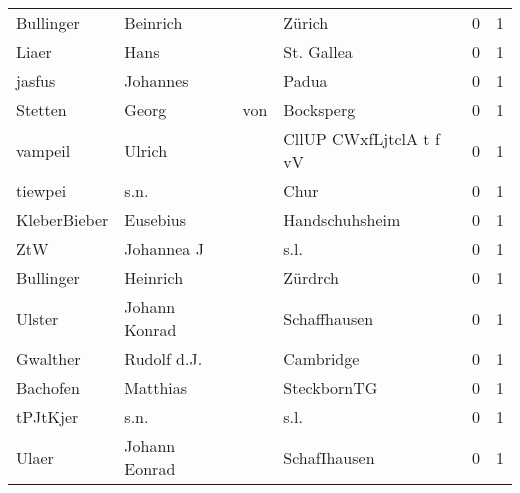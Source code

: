 \begin{center}
\begin{tiny}
\begin{longtabu}{llllrr}
                Bullinger &                           Beinrich &             &                                      Zürich &          0 &         1 \\
                    Liaer &                               Hans &             &                                  St. Gallea &          0 &         1 \\
                   jasfus &                           Johannes &             &                                       Padua &          0 &         1 \\
                  Stetten &                              Georg &         von &                                   Bocksperg &          0 &         1 \\
                  vampeil &                             Ulrich &             &                     CllUP CWxfLjtclA t f vV &          0 &         1 \\
                  tiewpei &                               s.n. &             &                                        Chur &          0 &         1 \\
             KleberBieber &                           Eusebius &             &                              Handschuhsheim &          0 &         1 \\
                      ZtW &                         Johannea J &             &                                        s.l. &          0 &         1 \\
                Bullinger &                           Heinrich &             &                                     Zürdrch &          0 &         1 \\
                   Ulster &                      Johann Konrad &             &                                Schaffhausen &          0 &         1 \\
                 Gwalther &                        Rudolf d.J. &             &                                   Cambridge &          0 &         1 \\
                 Bachofen &                           Matthias &             &                                 SteckbornTG &          0 &         1 \\
                 tPJtKjer &                               s.n. &             &                                        s.l. &          0 &         1 \\
                    Ulaer &                      Johann Eonrad &             &                                SchafIhausen &          0 &         1 \\

\end{longtabu}
\end{tiny}
\end{center}
